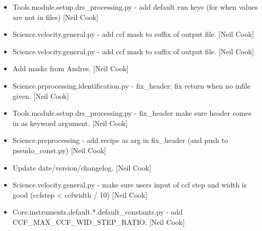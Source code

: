 \documentclass[a4paper,10pt,english]{report}
\begin{document}
\begin{itemize}
\item {} 
Tools.module.setup.drs\_processing.py - add default run keys (for when
values are not in files) {[}Neil Cook{]}

\item {} 
Science.velocity.general.py - add ccf mask to suffix of output file.
{[}Neil Cook{]}

\item {} 
Science.velocity.general.py - add ccf mask to suffix of output file.
{[}Neil Cook{]}

\item {} 
Add masks from Andres. {[}Neil Cook{]}

\item {} 
Science.prprocessing.identification.py - fix\_header: fix return when
no infile given. {[}Neil Cook{]}

\item {} 
Tools.module.setup.drs\_processing.py - fix\_header make sure header
comes in as keyword argument. {[}Neil Cook{]}

\item {} 
Science.preprocessing - add recipe as arg in fix\_header (and push to
pseudo\_const.py) {[}Neil Cook{]}

\item {} 
Update date/version/changelog. {[}Neil Cook{]}

\item {} 
Science.velocity.general.py - make sure users input of ccf step and
width is good (ccfstep \textless{} ccfwidth / 10) {[}Neil Cook{]}

\item {} 
Core.instruments.default.*.default\_constants.py - add
CCF\_MAX\_CCF\_WID\_STEP\_RATIO. {[}Neil Cook{]}

\end{itemize}
\end{document}
